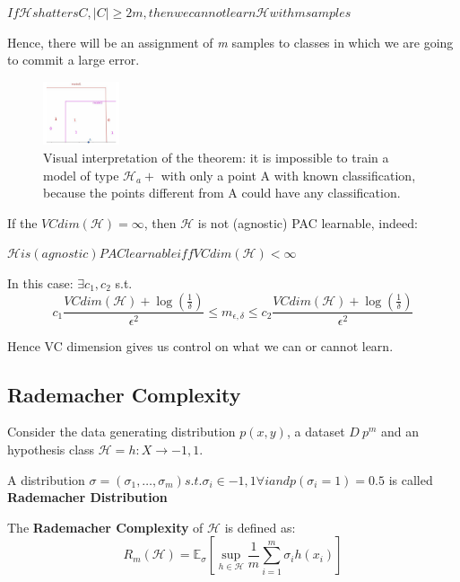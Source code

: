 \begin{theorem}
    $If \mathcal{H} shatters C, |C| \geq 2m, then we cannot learn \mathcal{H} with m samples$
\end{theorem}

Hence, there will be an assignment of \textit{m} samples to classes in which we are going to commit a large error. 

\begin{figure}[H]
    \centering
    \includegraphics[width=0.2\textwidth]{assets/fig12.png}
    \caption{Visual interpretation of the theorem: it is impossible to train a model of type $\mathcal{H}_a+$ with only a point A with known classification, because the points different from A could have any classification.}
    \label{fig:fig12}
\end{figure}

If the $VCdim(\mathcal{H}) = \infty$, then $\mathcal{H}$ is not (agnostic) PAC learnable, indeed: 
\begin{theorem}
    $\mathcal{H} is (agnostic) PAC learnable iff VCdim(\mathcal{H}) < \infty$
\end{theorem}

In this case: $\exists c_1,c_2$ s.t.
$$
c_1 \frac{VCdim(\mathcal{H}) + \log (\frac{1}{\delta})}{\epsilon^2} \leq m_{\epsilon, \delta} \leq c_2 \frac{VCdim(\mathcal{H}) + \log(\frac{1}{\delta})}{\epsilon^2}
$$

Hence VC dimension gives us control on what we can or cannot learn. 

\subsection{Rademacher Complexity}

Consider the data generating distribution $p(x, y)$, a dataset $D ~ p^m$ and an hypothesis class $\mathcal{H} = {h : X \to {-1,1}}$.

\begin{definitionblock}
    A distribution $\sigma = (\sigma_1, \dots, \sigma_m) s.t. \sigma_i \in {-1,1} \forall i and p(\sigma_i = 1) = 0.5$ is called \textbf{Rademacher Distribution}
\end{definitionblock}

\begin{definitionblock}
    The \textbf{Rademacher Complexity} of $\mathcal{H}$ is defined as:
    $$
    R_m(\mathcal{H}) = \mathbb{E}_{\sigma} \left[ \sup_{h \in \mathcal{H}} \dfrac{1}{m} \sum_{i=1}^m \sigma_i h(x_i) \right]
    $$
\end{definitionblock}

